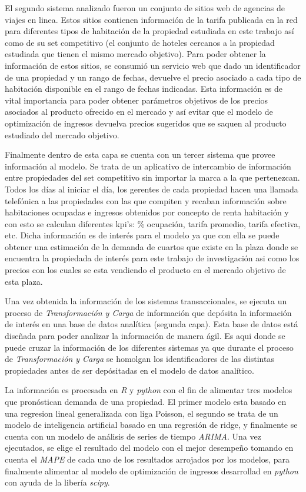El segundo sistema analizado fueron un conjunto de sitios web de agencias de viajes en linea. Estos sitios contienen información de la tarifa publicada en la red para diferentes tipos de habitación de la propiedad estudiada en este trabajo así como de su set competitivo (el conjunto de hoteles cercanos a la propiedad estudiada que tienen el mismo mercado objetivo). Para poder obtener la información de estos sitios, se consumió un servicio web que dado un identificador de una propiedad y un rango de fechas, devuelve el precio asociado a cada tipo de habitación disponible en el rango de fechas indicadas. Esta información es de vital importancia para poder obtener parámetros objetivos de los precios asociados al producto ofrecido en el mercado y así evitar que el modelo de optimización de ingresos devuelva precios sugeridos que se saquen al producto estudiado del mercado objetivo.

Finalmente dentro de esta capa se cuenta con un tercer sistema que provee información al modelo. Se trata de un aplicativo de intercambio de información entre propiedades del set competitivo sin importar la marca a la que pertenezcan. Todos los días al iniciar el día, los gerentes de cada propiedad hacen una llamada telefónica a las propiedades con las que compiten y recaban información sobre habitaciones ocupadas e ingresos obtenidos por concepto de renta habitación y con esto se calculan diferentes kpi's: \% ocupación, tarifa promedio, tarifa efectiva, etc. Dicha información es de interés para el modelo ya que con ella se puede obtener una estimación de la demanda de cuartos que existe en la plaza donde se encuentra la propiedada de interés para este trabajo de investigación asi como los precios con los cuales se esta vendiendo el producto en el mercado objetivo de esta plaza.

Una vez obtenida la información de los sistemas transaccionales, se ejecuta un proceso de \emph{Transformación y Carga} de información que depósita la información de interés en una base de datos analítica (segunda capa). Esta base de datos está diseñada para poder analizar la información de manera ágil. Es aqui donde se puede cruzar la información de los diferentes sistemas ya que durante el proceso de \emph{Transformación y Carga} se homolgan los identificadores de las distintas propiedades antes de ser depósitadas en el modelo de datos analítico.

La información es procesada en \emph{R} y \emph{python} con el fin de alimentar tres modelos que pronóstican demanda de una propiedad. El primer modelo esta basado en una regresion lineal generalizada con liga Poisson, el segundo se trata de un modelo de inteligencia artificial basado en una regresión de ridge, y finalmente se cuenta con un modelo de análisis de series de tiempo \emph{ARIMA}. Una vez ejecutados, se elige el resultado del modelo con el mejor desempeño tomando en cuenta el \emph{MAPE} de cada uno de los resultados arrojados por los modelos, para finalmente alimentar al modelo de optimización de ingresos desarrollad en \emph{python} con ayuda de la libería \emph{scipy}.

